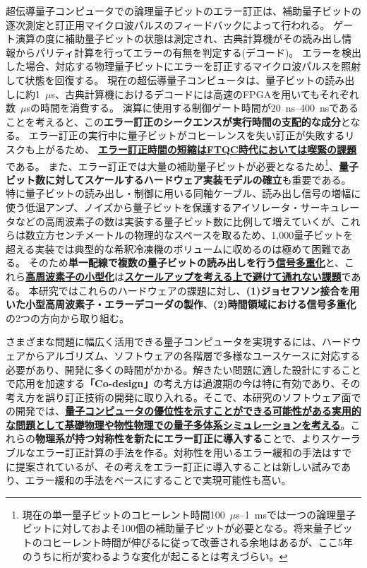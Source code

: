 \documentclass[11pt,a4j,dvipdfmx]{jarticle} 					%
\newcommand{\研究課題名}{誤り耐性量子コンピュータに向けた誤り訂正技術の開発(仮)}
\newcommand{\研究機関名}{東京大学}
\newcommand{\研究代表者氏名}{寺師弘二}
\newcommand{\研究期間の最終元号年度}{10}  %
\newcommand{\mybf}[1]{{\bfseries\sffamily#1}}
\begin{document}
超伝導量子コンピュータでの論理量子ビットのエラー訂正は、補助量子ビットの逐次測定と訂正用マイクロ波パルスのフィードバックによって行われる。
ゲート演算の度に補助量子ビットの状態は測定され、古典計算機がその読み出し情報からパリティ計算を行ってエラーの有無を判定する(デコード)。
エラーを検出した場合、対応する物理量子ビットにエラーを訂正するマイクロ波パルスを照射して状態を回復する。
現在の超伝導量子コンピュータは、量子ビットの読み出しに約1~$\mu$s、古典計算機におけるデコードには高速のFPGAを用いてもそれぞれ数~$\mu$sの時間を消費する。
演算に使用する制御ゲート時間が20~ns--400~nsであることを考えると、この\mybf{エラー訂正のシークエンスが実行時間の支配的な成分}となる。
エラー訂正の実行中に量子ビットがコヒーレンスを失い訂正が失敗するリスクも上がるため、 \mybf{\ul{エラー訂正時間の短縮はFTQC時代においては喫緊の課題}}である。
また、エラー訂正では大量の補助量子ビットが必要となるため\footnote{現在の単一量子ビットのコヒーレント時間100~$\mu$s--1~msでは一つの論理量子ビットに対しておよそ100個の補助量子ビットが必要となる。将来量子ビットのコヒーレント時間が伸びるに従って改善される余地はあるが、ここ5年のうちに桁が変わるような変化が起こるとは考えづらい。}、\mybf{量子ビット数に対してスケールするハードウェア実装モデルの確立}も重要である。
特に量子ビットの読み出し・制御に用いる同軸ケーブル、読み出し信号の増幅に使う低温アンプ、ノイズから量子ビットを保護するアイソレータ・サーキュレータなどの高周波素子の数は実装する量子ビット数に比例して増えていくが、これらは数立方センチメートルの物理的なスペースを取るため、1,000量子ビットを超える実装では典型的な希釈冷凍機のボリュームに収めるのは極めて困難である。
そのため\mybf{単一配線で複数の量子ビットの読み出しを行う\ul{信号多重化}}と、これら\mybf{\ul{高周波素子の小型化}}は\mybf{\ul{スケールアップを考える上で避けて通れない課題}}である。
本研究ではこれらのハードウェアの課題に対し、\mybf{(1)ジョセフソン接合を用いた小型高周波素子・エラーデコーダの製作}、\mybf{(2)時間領域における信号多重化}の2つの方向から取り組む。

さまざまな問題に幅広く活用できる量子コンピュータを実現するには、ハードウェアからアルゴリズム、ソフトウェアの各階層で多様なユースケースに対応する必要があり、開発に多くの時間がかかる。解きたい問題に適した設計にすることで応用を加速する\mybf{「Co-design」}の考え方は過渡期の今は特に有効であり、その考え方を誤り訂正技術の開発に取り入れる。そこで、本研究のソフトウェア面での開発では、\mybf{\ul{量子コンピュータの優位性を示すことができる可能性がある実用的な問題として基礎物理や物性物理での量子多体系シミュレーションを考える}}。これらの\mybf{物理系が持つ対称性を新たにエラー訂正に導入する}ことで、よりスケーラブルなエラー訂正計算の手法を作る。対称性を用いるエラー緩和の手法はすでに提案されているが、その考えをエラー訂正に導入することは新しい試みであり、エラー緩和の手法をベースにすることで実現可能性も高い。
\end{document}

